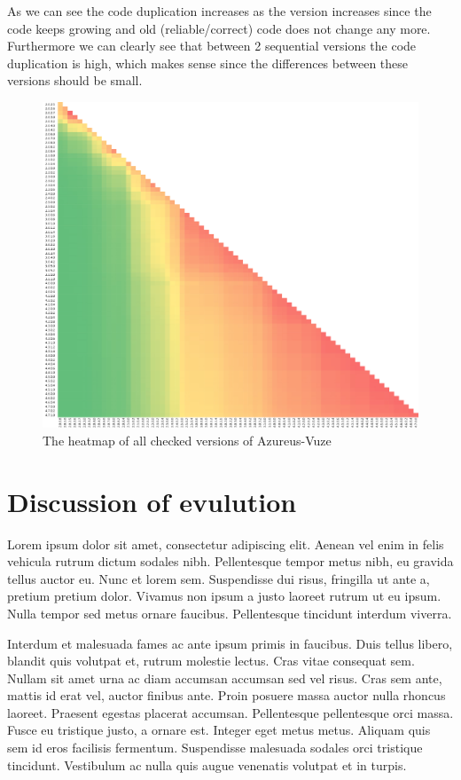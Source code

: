 \documentclass[a4paper,twoside,11pt]{article}
\newcommand{\av}{{\sc Azureus-Vuze}~}
\begin{document}
As we can see the code duplication increases as the version increases since the code keeps growing and old (reliable/correct) code does not change any more. Furthermore we can clearly see that between 2 sequential versions the code duplication is high, which makes sense since the differences between these versions should be small.
\begin{figure}[!h]
\includegraphics[scale=0.8]{../results/heatMap.pdf}
\caption{The heatmap of all checked versions of \av}
\label{fig:heatmap}
\end{figure}

\section{Discussion of evulution}
\label{sec:discussion}
Lorem ipsum dolor sit amet, consectetur adipiscing elit. Aenean vel enim in felis vehicula rutrum dictum sodales nibh. Pellentesque tempor metus nibh, eu gravida tellus auctor eu. Nunc et lorem sem. Suspendisse dui risus, fringilla ut ante a, pretium pretium dolor. Vivamus non ipsum a justo laoreet rutrum ut eu ipsum. Nulla tempor sed metus ornare faucibus. Pellentesque tincidunt interdum viverra.

Interdum et malesuada fames ac ante ipsum primis in faucibus. Duis tellus libero, blandit quis volutpat et, rutrum molestie lectus. Cras vitae consequat sem. Nullam sit amet urna ac diam accumsan accumsan sed vel risus. Cras sem ante, mattis id erat vel, auctor finibus ante. Proin posuere massa auctor nulla rhoncus laoreet. Praesent egestas placerat accumsan. Pellentesque pellentesque orci massa. Fusce eu tristique justo, a ornare est. Integer eget metus metus. Aliquam quis sem id eros facilisis fermentum. Suspendisse malesuada sodales orci tristique tincidunt. Vestibulum ac nulla quis augue venenatis volutpat et in turpis.
\end{document}
